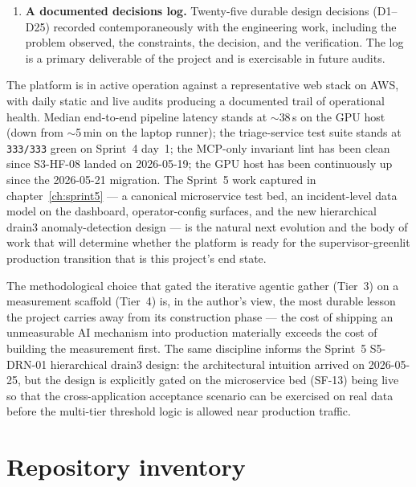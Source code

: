 \documentclass[11pt,a4paper,oneside]{report}
\begin{document}
\begin{enumerate}
        and surface that captures operator overrides and ratings on
        RCAs (shipped end-to-end via SF-6 and SF-7 on Sprint~4
        day~1) and propagates them into the suppression layer, the
        precision/recall metrics, and (in Sprint~5) the curated
        retrieval corpus.
  \item \textbf{A documented decisions log.}  Twenty-five durable
        design decisions (D1--D25) recorded contemporaneously with
        the engineering work, including the problem observed, the
        constraints, the decision, and the verification.  The log
        is a primary deliverable of the project and is exercisable
        in future audits.
\end{enumerate}

The platform is in active operation against a representative web
stack on AWS, with daily static and live audits producing a
documented trail of operational health.  Median end-to-end pipeline
latency stands at $\sim$38\,s on the GPU host (down from $\sim$5\,min
on the laptop runner); the triage-service test suite stands at
\texttt{333/333} green on Sprint~4 day~1; the MCP-only invariant
lint has been clean since S3-HF-08 landed on 2026-05-19; the GPU
host has been continuously up since the 2026-05-21 migration.  The
Sprint~5 work captured in chapter~\ref{ch:sprint5} --- a canonical
microservice test bed, an incident-level data model on the
dashboard, operator-config surfaces, and the new hierarchical
drain3 anomaly-detection design --- is the natural next evolution
and the body of work that will determine whether the platform is
ready for the supervisor-greenlit production transition that is
this project's end state.

The methodological choice that gated the iterative agentic gather
(Tier~3) on a measurement scaffold (Tier~4) is, in the author's
view, the most durable lesson the project carries away from its
construction phase --- the cost of shipping an unmeasurable AI
mechanism into production materially exceeds the cost of building
the measurement first.  The same discipline informs the Sprint~5
S5-DRN-01 hierarchical drain3 design: the architectural intuition
arrived on 2026-05-25, but the design is explicitly gated on the
microservice bed (SF-13) being live so that the cross-application
acceptance scenario can be exercised on real data before the
multi-tier threshold logic is allowed near production traffic.

\appendix
\chapter{Repository inventory}
\label{app:repos}
\end{document}
